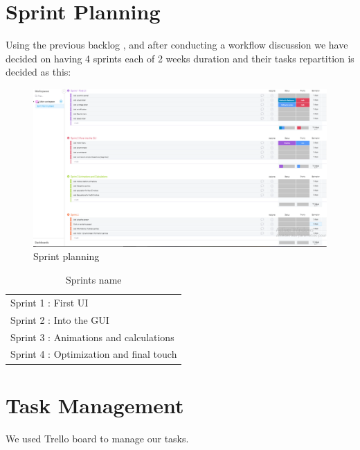 \documentclass[]{report}
\begin{document}
\section{Sprint Planning}
Using the previous backlog , and after conducting a workflow
discussion we have decided on having 4 sprints each
of 2 weeks duration and their tasks repartition is decided as
this:
\begin{figure}[H]
	\begin{center}
		\includegraphics[scale=0.7, frame]{SprintPlanning.png}
		\caption{Sprint planning}
	\end{center}
\end{figure}

\begin{table}[H]
	\begin{center}
	\begin{tabular}{|l|}
		\hline
		\rowcolor[HTML]{6600ff}
		\multicolumn{1}{|c|}{\color{white}\textbf{Sprint name}} \\ \hline
		Sprint 1 : First UI                        \\ \hline
		Sprint 2 : Into the GUI                    \\ \hline
		Sprint 3 : Animations and calculations     \\ \hline
		Sprint 4 : Optimization and final touch    \\ \hline
	\end{tabular}
\end{center}
\caption[Sprints name]{Sprints name}
\end{table}

\section{Task Management}
We used Trello board to manage our tasks.
\end{document}
